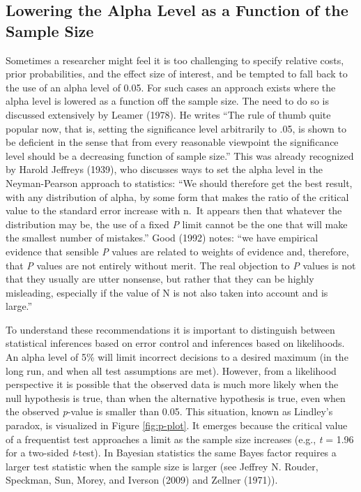 \documentclass[
  english,
  ,man,floatsintext]{apa6}
\begin{document}
\hypertarget{lowering-the-alpha-level-as-a-function-of-the-sample-size}{%
\subsection{Lowering the Alpha Level as a Function of the Sample Size}\label{lowering-the-alpha-level-as-a-function-of-the-sample-size}}

Sometimes a researcher might feel it is too challenging to specify relative costs, prior probabilities, and the effect size of interest, and be tempted to fall back to the use of an alpha level of 0.05. For such cases an approach exists where the alpha level is lowered as a function off the sample size. The need to do so is discussed extensively by Leamer (1978). He writes ``The rule of thumb quite popular now, that is, setting the significance level arbitrarily to .05, is shown to be deficient in the sense that from every reasonable viewpoint the significance level should be a decreasing function of sample size.'' This was already recognized by Harold Jeffreys (1939), who discusses ways to set the alpha level in the Neyman-Pearson approach to statistics: ``We should therefore get the best result, with any distribution of alpha, by some form that makes the ratio of the critical value to the standard error increase with n.~It appears then that whatever the distribution may be, the use of a fixed \emph{P} limit cannot be the one that will make the smallest number of mistakes.'' Good (1992) notes: ``we have empirical evidence that sensible \emph{P} values are related to weights of evidence and, therefore, that \emph{P} values are not entirely without merit. The real objection to \emph{P} values is not that they usually are utter nonsense, but rather that they can be highly misleading, especially if the value of N is not also taken into account and is large.''

To understand these recommendations it is important to distinguish between statistical inferences based on error control and inferences based on likelihoods. An alpha level of 5\% will limit incorrect decisions to a desired maximum (in the long run, and when all test assumptions are met). However, from a likelihood perspective it is possible that the observed data is much more likely when the null hypothesis is true, than when the alternative hypothesis is true, even when the observed \emph{p}-value is smaller than 0.05. This situation, known as Lindley's paradox, is visualized in Figure \ref{fig:p-plot}. It emerges because the critical value of a frequentist test approaches a limit as the sample size increases (e.g., \emph{t} = 1.96 for a two-sided \emph{t}-test). In Bayesian statistics the same Bayes factor requires a larger test statistic when the sample size is larger (see Jeffrey N. Rouder, Speckman, Sun, Morey, and Iverson (2009) and Zellner (1971)).
\end{document}
